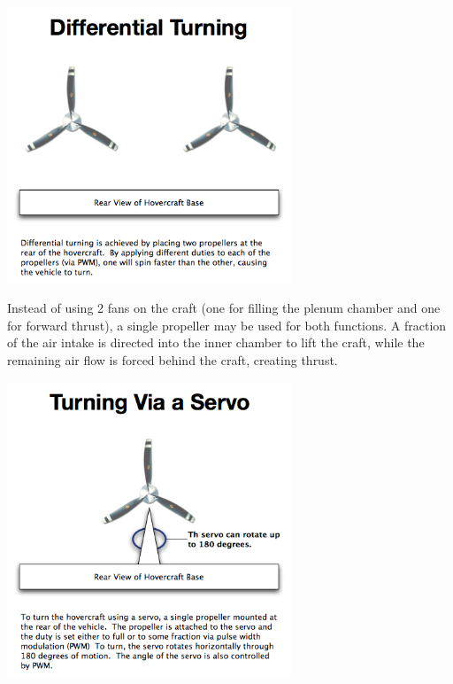  \begin{minipage}{6.5in}
  \begin{center}
    \includegraphics[width=85mm]{imageSources/differentialTurning.png}
  \end{center}
  \label{differentialTurning}
  \end{minipage}

Instead of using 2 fans on the craft (one for filling the plenum chamber and one for forward thrust), a single propeller may be used for both functions. A fraction of the air intake is directed into the inner chamber to lift the craft, while the remaining air flow is forced behind the craft, creating thrust.

  \begin{minipage}{6.5in}
  \begin{center}
    \includegraphics[width=85mm]{imageSources/servoTurning.png}
  \end{center}
  \label{servoTurning}
  \end{minipage}

